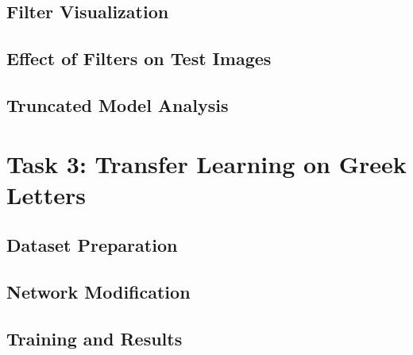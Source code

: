 \documentclass[11pt]{article}
\begin{document}
\subsection{Filter Visualization}


\subsection{Effect of Filters on Test Images}


\subsection{Truncated Model Analysis}


\section{Task 3: Transfer Learning on Greek Letters}


\subsection{Dataset Preparation}


\subsection{Network Modification}


\subsection{Training and Results}

\end{document}
